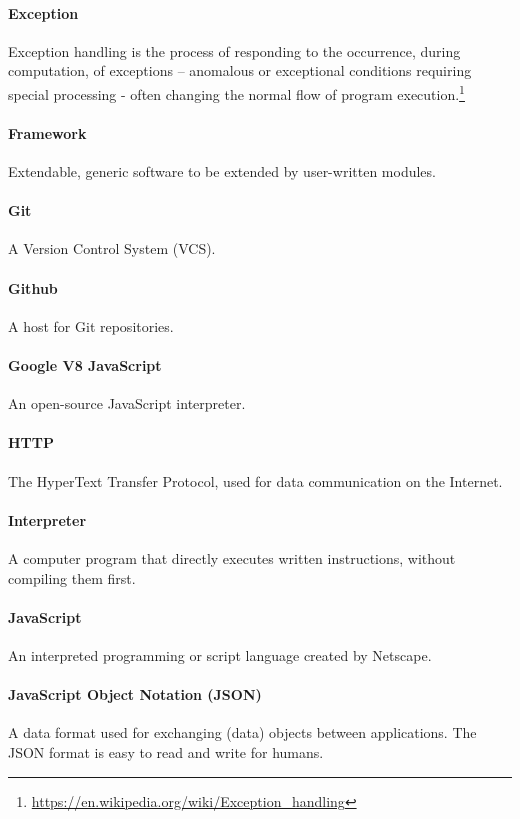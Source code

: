 \paragraph{Exception}
Exception handling is the process of responding to the occurrence, during computation, of exceptions – anomalous or exceptional conditions requiring special processing - often changing the normal flow of program execution.\footnote{\url{https://en.wikipedia.org/wiki/Exception_handling}}

\paragraph{Framework}
Extendable, generic software to be extended by user-written modules.

\paragraph{Git}
A Version Control System (VCS).

\paragraph{Github}
A host for Git repositories.

\paragraph{Google V8 JavaScript}
An open-source JavaScript interpreter.

\paragraph{HTTP}
The HyperText Transfer Protocol, used for data communication on the Internet.

\paragraph{Interpreter}
A computer program that directly executes written instructions, without compiling them first.

\paragraph{JavaScript}
An interpreted programming or script language created by Netscape.

\paragraph{JavaScript Object Notation (JSON)}
A data format used for exchanging (data) objects between applications. The JSON format is easy to read and write for humans.

